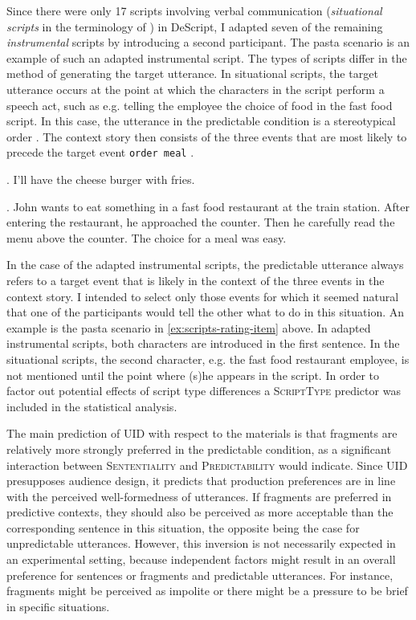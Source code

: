 Since there were only 17 scripts involving verbal communication (\textit{situational scripts} in the terminology of \citet{schank.abelson1977}) in DeScript, I adapted seven of the remaining \textit{instrumental} scripts by introducing a second participant. The pasta scenario is an example of such an adapted instrumental script. The types of scripts differ in the method of generating the target utterance. In situational scripts, the target utterance occurs at the point at which the characters in the script perform a speech act, such as e.g. telling the employee the choice of food in the fast food script. In this case, the utterance in the predictable condition is a stereotypical order \Next. The context story then consists of the three events that are most likely to precede the target event \texttt{order meal} \NNext.

\ex. I'll have the cheese burger with fries.
      
\ex. John wants to eat something in a fast food restaurant at the train station. After entering the restaurant, he approached the counter. Then he carefully read the menu above the counter. The choice for a meal was easy.

In the case of the adapted instrumental scripts, the predictable utterance always refers to a target event that is likely in the context of the three events in the context story. I intended to select only those events for which it seemed natural that one of the participants would tell the other what to do in this situation. An example is the pasta scenario in \ref{ex:scripts-rating-item} above. In adapted instrumental scripts, both characters are introduced in the first sentence. In the situational scripts, the second character, e.g. the fast food restaurant employee, is not mentioned until the point where (s)he appears in the script. In order to factor out potential effects of script type differences a \textsc{ScriptType} predictor was included in the statistical analysis.

The main prediction of UID with respect to the materials is that fragments are relatively more strongly preferred in the predictable condition, as a significant interaction between \textsc{Sententiality} and \textsc{Predictability} would indicate. Since UID presupposes audience design, it predicts that production preferences are in line with the perceived well-formedness of utterances. If fragments are preferred in predictive contexts, they should also be perceived as more acceptable than the corresponding sentence in this situation, the opposite being the case for unpredictable utterances. However, this inversion is not necessarily expected in an experimental setting, because independent factors might result in an overall preference for sentences or fragments and predictable utterances. For instance, fragments might be perceived as impolite or there might be a pressure to be brief in specific situations.

